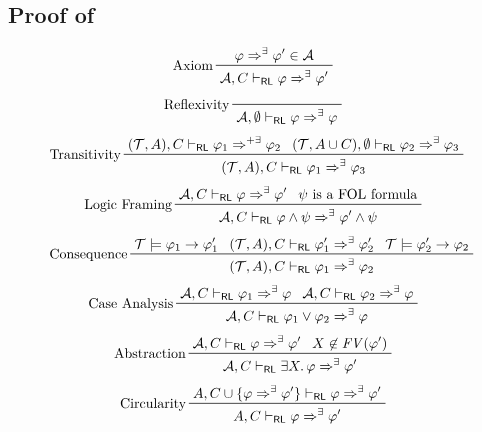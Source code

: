 \subsection{Proof of~}\label{app:crlsoundness}

\begin{figure}
    \centering
    \begin{align*}
        & \prftree[l]{Axiom}
          { \varphi \Rightarrow^{\exists} \varphi^\prime \in \mathcal{A} }
          { \mathcal{A}, C \vdash_\RL \varphi \Rightarrow^{\exists} \varphi^\prime }
    \end{align*}
    \begin{align*}
        & \prftree[l]{Reflexivity}
          { \mathcal{A}, \emptyset \vdash_\RL \varphi \Rightarrow^{\exists} \varphi }
    \end{align*}
    \begin{align*}
        & \prftree[l]{Transitivity}
          { (\mathcal{T}, A), C \vdash_\RL \varphi_1 \Rightarrow^{+ \exists} \varphi_2 }
          { (\mathcal{T}, A \cup C), \emptyset \vdash_\RL \varphi_2 \Rightarrow^{\exists} \varphi_3 }
          { (\mathcal{T}, A), C \vdash_\RL \varphi_1 \Rightarrow^{\exists} \varphi_3 }
    \end{align*}
    \begin{align*}
        & \prftree[l]{Logic Framing}
          { \mathcal{A}, C \vdash_\RL \varphi \Rightarrow^{\exists} \varphi^\prime }
          { \psi \mbox{ is a FOL formula} }
          { \mathcal{A}, C \vdash_\RL \varphi \land \psi \Rightarrow^{\exists} \varphi^\prime \land \psi }
    \end{align*}
    \begin{align*}
        & \prftree[l]{Consequence}
          { \mathcal{T} \modelsML \varphi_1 \rightarrow \varphi_1^\prime }
          { (\mathcal{T}, A), C \vdash_\RL \varphi_1^\prime \Rightarrow^{\exists} \varphi_2^\prime }
          { \mathcal{T} \modelsML \varphi_2^\prime \rightarrow \varphi_2 }
          { (\mathcal{T}, A), C \vdash_\RL \varphi_1 \Rightarrow^{\exists} \varphi_2 }
    \end{align*}
    \begin{align*}
        & \prftree[l]{Case Analysis}
          { \mathcal{A}, C \vdash_\RL \varphi_1 \Rightarrow^{\exists} \varphi }
          { \mathcal{A}, C \vdash_\RL \varphi_2 \Rightarrow^{\exists} \varphi }
          { \mathcal{A}, C \vdash_\RL \varphi_1 \lor \varphi_2 \Rightarrow^{\exists} \varphi }
    \end{align*}
    \begin{align*}
        & \prftree[l]{Abstraction}
          { \mathcal{A}, C \vdash_\RL \varphi \Rightarrow^{\exists} \varphi^\prime }
          { X \not\in \mathit{FV}(\varphi^\prime) }
          { \mathcal{A}, C \vdash_\RL \exists X.\, \varphi \Rightarrow^{\exists} \varphi^\prime }
    \end{align*}
    \begin{align*}
        & \prftree[l]{Circularity}
          { A, C \cup \{ \varphi\Rightarrow^\exists \varphi^\prime \} \vdash_\RL \varphi \Rightarrow^\exists \varphi^\prime }
          { A, C \vdash_\RL \varphi \Rightarrow^\exists \varphi^\prime }
    \end{align*}


\end{figure}
